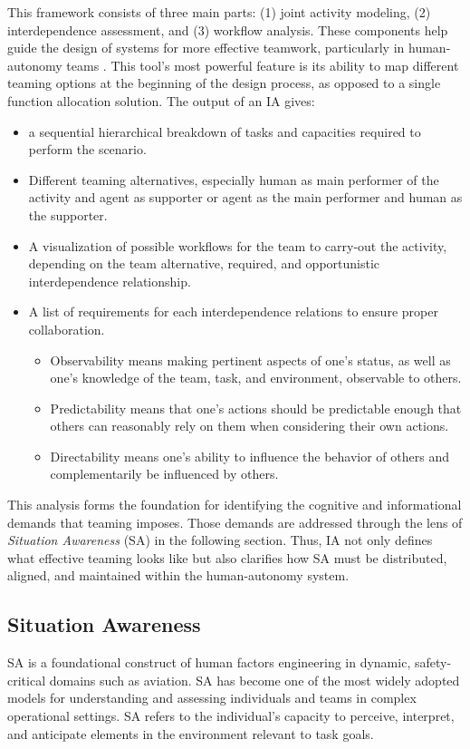 \documentclass[12pt,a4paper]{article} %
\begin{document}
	This framework consists of three main parts: (1) joint activity modeling, (2) interdependence assessment, and (3) workflow analysis. These components help guide the design of systems for more effective teamwork, particularly in human-autonomy teams \parencite{johnson_understanding_2018}.
	This tool's most powerful feature is its ability to map different teaming options at the beginning of the design process, as opposed to a single function allocation solution. The output of an IA gives:
	\begin{itemize}
		\item a sequential hierarchical breakdown of tasks and capacities required to perform the scenario. 
		\item Different teaming alternatives, especially human as main performer of the activity and agent as supporter or agent as the main performer and human as the supporter.
		\item A visualization of possible workflows for the team to carry-out the activity, depending on the team alternative, required, and opportunistic interdependence relationship.
		\item A list of requirements for each interdependence relations to ensure proper collaboration.
		\begin{itemize}
			\item Observability means making pertinent aspects of one's status, as well as one's knowledge of the team, task, and environment, observable to others.
			\item Predictability means that one's actions should be predictable enough that others can reasonably rely on them when considering their own actions.
			\item Directability means one's ability to influence the behavior of others and complementarily be influenced by others.
		\end{itemize}
	\end{itemize}
	This analysis forms the foundation for identifying the cognitive and informational demands that teaming imposes. Those demands are addressed through the lens of \textit{Situation Awareness} (SA) in the following section. Thus, IA not only defines what effective teaming looks like but also clarifies how SA must be distributed, aligned, and maintained within the human-autonomy system.

	\subsection{Situation Awareness}
	SA is a foundational construct of human factors engineering in dynamic, safety-critical domains such as aviation. SA has become one of the most widely adopted models for understanding and assessing individuals and teams in complex operational settings. SA refers to the individual's capacity to perceive, interpret, and anticipate elements in the environment relevant to task goals.
\end{document}
